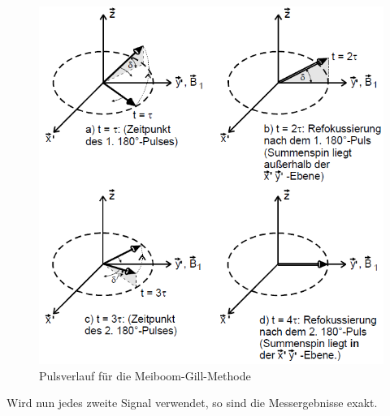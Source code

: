 \documentclass[]{scrartcl}
\begin{document}
\begin{figure}[H]
\centering
\includegraphics[width=12cm]{images/Meiboom_Gill_Methode.png}
\caption{Pulsverlauf für die Meiboom-Gill-Methode}
\label{fig::Meiboom_Gill_Methode}
\end{figure}
Wird nun jedes zweite Signal verwendet, so sind die Messergebnisse exakt.
\end{document}
